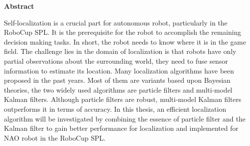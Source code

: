 \thispagestyle{empty}
\vspace*{1.0cm}

\begin{center}
   \LARGE \textbf{Abstract}
\end{center}

\vspace*{0.5cm}

\noindent

Self-localization is a crucial part for autonomous robot, particularly in the RoboCup \gls{SPL}. It is the prerequisite for the robot to accomplish the remaining decision making tasks. In short, the robot needs to know where it is in the game field. The challenge lies in the domain of localization is that robots have only partial observations about the surrounding world, they need to fuse sensor information to estimate its location. Many localization algorithms have been proposed in the past years. Most of them are variants based upon Bayesian theories, the two widely used algorithms are particle filters and multi-model Kalman filters. Although particle filters are robust, multi-model Kalman filters outperforms it in terms of accuracy. In this thesis, an efficient localization algorithm will be investigated by combining the essence of particle filter and the Kalman filter to gain better performance for localization and implemented for NAO robot in the RoboCup \gls{SPL}.

